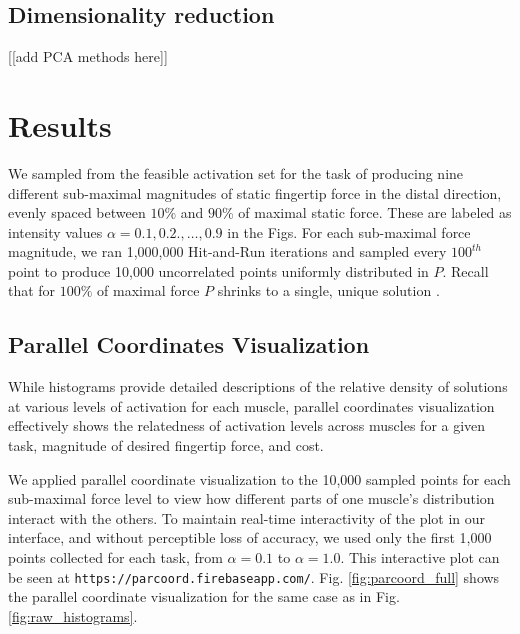\documentclass[10pt,letterpaper]{article}
\begin{document}
\subsection*{Dimensionality reduction}

[[add PCA methods here]]


\section*{Results}

We sampled from the feasible activation set for the task of producing nine different sub-maximal magnitudes of static fingertip force in the distal direction, evenly spaced between  $10\%$ and $90\%$ of maximal static force. These are labeled as intensity values $\alpha = 0.1, 0.2., \hdots, 0.9$ in the Figs.  For each sub-maximal force magnitude, we ran 1,000,000 Hit-and-Run iterations and sampled every $100^{th}$ point to produce 10,000 uncorrelated points uniformly distributed in $P$. Recall that for $100\%$ of maximal force $P$ shrinks to a single, unique solution \cite{valero-cuevas2007large}.

\subsection*{Parallel Coordinates Visualization}
While histograms provide detailed descriptions of the relative density of solutions at various levels of activation for each muscle,  parallel coordinates visualization  effectively shows the relatedness of activation levels across muscles for a given task, magnitude of desired fingertip force, and cost.

We applied parallel coordinate visualization to the 10,000 sampled points for each sub-maximal force level to view how different parts of one muscle's distribution interact with the others.
To maintain real-time interactivity of the plot in our interface, and without perceptible loss of accuracy, we used only the first 1,000 points collected for each task, from $\alpha = 0.1$ to $\alpha = 1.0$. This interactive plot can be seen at \texttt{https://parcoord.firebaseapp.com/}. Fig. \ref{fig:parcoord_full} shows the parallel coordinate visualization for the same case as in Fig. \ref{fig:raw_histograms}.
\end{document}
